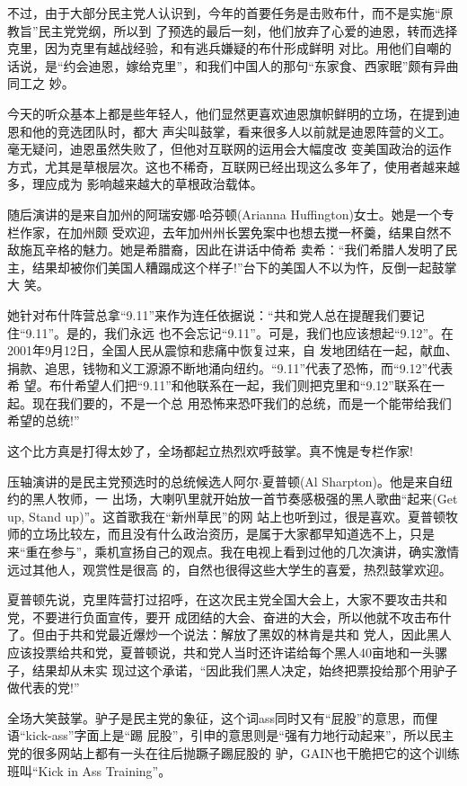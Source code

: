 ﻿\documentclass[11pt]{article}
\begin{document}
不过，由于大部分民主党人认识到，今年的首要任务是击败布什，而不是实施``原教旨''民主党党纲，所以到
了预选的最后一刻，他们放弃了心爱的迪恩，转而选择克里，因为克里有越战经验，和有逃兵嫌疑的布什形成鲜明
对比。用他们自嘲的话说，是``约会迪恩，嫁给克里''，和我们中国人的那句``东家食、西家眠''颇有异曲同工之
妙。

今天的听众基本上都是些年轻人，他们显然更喜欢迪恩旗帜鲜明的立场，在提到迪恩和他的竞选团队时，都大
声尖叫鼓掌，看来很多人以前就是迪恩阵营的义工。毫无疑问，迪恩虽然失败了，但他对互联网的运用会大幅度改
变美国政治的运作方式，尤其是草根层次。这也不稀奇，互联网已经出现这么多年了，使用者越来越多，理应成为
影响越来越大的草根政治载体。

随后演讲的是来自加州的阿瑞安娜$\cdot$哈芬顿(Arianna Huffington)女士。她是一个专栏作家，在加州颇
受欢迎，去年加州州长罢免案中也想去搅一杯羹，结果自然不敌施瓦辛格的魅力。她是希腊裔，因此在讲话中倚希
卖希：``我们希腊人发明了民主，结果却被你们美国人糟蹋成这个样子!''台下的美国人不以为忤，反倒一起鼓掌大
笑。

她针对布什阵营总拿``9.11''来作为连任依据说：``共和党人总在提醒我们要记住``9.11''。是的，我们永远
也不会忘记``9.11''。可是，我们也应该想起``9.12''。在2001年9月12日，全国人民从震惊和悲痛中恢复过来，自
发地团结在一起，献血、捐款、追思，钱物和义工源源不断地涌向纽约。``9.11''代表了恐怖，而``9.12''代表希
望。布什希望人们把``9.11''和他联系在一起，我们则把克里和``9.12''联系在一起。现在我们要的，不是一个总
用恐怖来恐吓我们的总统，而是一个能带给我们希望的总统!''

这个比方真是打得太妙了，全场都起立热烈欢呼鼓掌。真不愧是专栏作家!

压轴演讲的是民主党预选时的总统候选人阿尔$\cdot$夏普顿(Al Sharpton)。他是来自纽约的黑人牧师，一
出场，大喇叭里就开始放一首节奏感极强的黑人歌曲``起来(Get up, Stand up)''。这首歌我在``新州草民''的网
站上也听到过，很是喜欢。夏普顿牧师的立场比较左，而且没有什么政治资历，是属于大家都早知道选不上，只是
来``重在参与''，乘机宣扬自己的观点。我在电视上看到过他的几次演讲，确实激情远过其他人，观赏性是很高
的，自然也很得这些大学生的喜爱，热烈鼓掌欢迎。

夏普顿先说，克里阵营打过招呼，在这次民主党全国大会上，大家不要攻击共和党，不要进行负面宣传，要开
成团结的大会、奋进的大会，所以他就不攻击布什了。但由于共和党最近爆炒一个说法：解放了黑奴的林肯是共和
党人，因此黑人应该投票给共和党，夏普顿说，共和党人当时还许诺给每个黑人40亩地和一头骡子，结果却从未实
现过这个承诺，``因此我们黑人决定，始终把票投给那个用驴子做代表的党!''

全场大笑鼓掌。驴子是民主党的象征，这个词ass同时又有``屁股''的意思，而俚语``kick-ass''字面上是``踢
屁股''，引申的意思则是``强有力地行动起来''，所以民主党的很多网站上都有一头在往后抛蹶子踢屁股的
驴，GAIN也干脆把它的这个训练班叫``Kick in Ass Training''。
\end{document}
